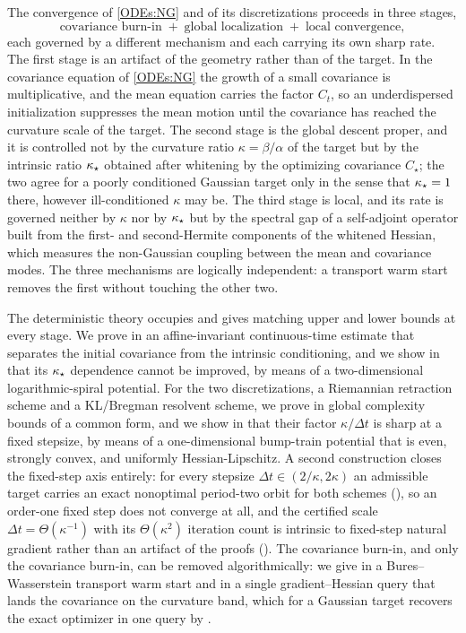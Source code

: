 The convergence of \eqref{ODEs:NG} and of its discretizations proceeds in three
stages,
\begin{equation}\label{eq:three-stage}
    \boxed{\;
    \text{covariance burn-in}
    \;+\;
    \text{global localization}
    \;+\;
    \text{local convergence},
    \;}
\end{equation}
each governed by a different mechanism and each carrying its own sharp rate. The
first stage is an artifact of the geometry rather than of the target. In the
covariance equation of \eqref{ODEs:NG} the growth of a small covariance is
multiplicative, and the mean equation carries the factor $C_t$, so an
underdispersed initialization suppresses the mean motion until the covariance
has reached the curvature scale of the target. The second stage is the global
descent proper, and it is controlled not by the curvature ratio
$\kappa = \beta/\alpha$ of the target but by the intrinsic ratio $\kappa_\star$
obtained after whitening by the optimizing covariance $C_\star$; the two agree
for a poorly conditioned Gaussian target only in the sense that $\kappa_\star = 1$
there, however ill-conditioned $\kappa$ may be. The third stage is local, and its
rate is governed neither by $\kappa$ nor by $\kappa_\star$ but by the spectral gap
of a self-adjoint operator built from the first- and second-Hermite components
of the whitened Hessian, which measures the non-Gaussian coupling between the
mean and covariance modes. The three mechanisms are logically independent: a
transport warm start removes the first without touching the other two.

The deterministic theory occupies  and gives matching
upper and lower bounds at every stage. We prove in  an
affine-invariant continuous-time estimate that separates the initial covariance
from the intrinsic conditioning, and we show in  that its
$\kappa_\star$ dependence cannot be improved, by means of a two-dimensional
logarithmic-spiral potential. For the two discretizations, a Riemannian
retraction scheme and a KL/Bregman resolvent scheme, we prove in
 global complexity bounds of a common form, and
we show in  that their factor $\kappa/\Delta t$ is sharp at
a fixed stepsize, by means of a one-dimensional bump-train potential that is
even, strongly convex, and uniformly Hessian-Lipschitz. A second construction
closes the fixed-step axis entirely: for every stepsize
$\Delta t\in(2/\kappa,2\kappa)$ an admissible target carries an exact nonoptimal
period-two orbit for both schemes (), so an order-one fixed
step does not converge at all, and the certified scale
$\Delta t=\Theta(\kappa^{-1})$ with its $\Theta(\kappa^2)$ iteration count is
intrinsic to fixed-step natural gradient rather than an artifact of the proofs
(). The covariance burn-in,
and only the covariance burn-in, can be removed algorithmically: we give in
 a Bures--Wasserstein transport warm start and in
 a single gradient--Hessian query that lands the
covariance on the curvature band, which for a Gaussian target recovers the exact
optimizer in one query by .

